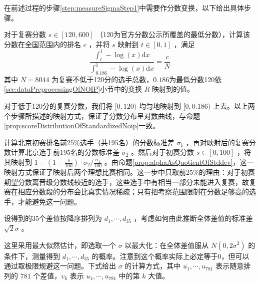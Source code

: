             在前述过程的步骤\ref{step:measureSigmaStep1}中需要作分数变换，以下给出具体步骤。
            \begin{asparaenum}[\bfseries{步骤} 1.]
                \item 对于复赛分数 $s\in [120,600]$ （120为官方分数公示所覆盖的最低分数），计算该分数在全国范围内的排名 $c$ ，并将 $s$ 映射到 $t\in [0,1]$ ，满足 $$\frac{\int_t^1 -\log(x)\mathrm{d}x}{\int_{0.186}^1 -\log(x)\mathrm{d}x}=\frac cN$$ 其中 $N=8044$ 为复赛不低于120分的选手总数，$0.186$为最低分数120依\ref{sec:dataPreprocessingOfNOIP}小节中的变换 $R$ 映射到的值。
                \item 对于低于120分的复赛分数，我们将 $[0,120)$ 均匀地映射到 $[0,0.186)$ 上去。以上两个步骤所描述的映射方式，保证了分数分布呈对数曲线，与命题\ref{prop:scoreDistributionOfStandardizedNoip}一致。
                \item 计算北京初赛排名前25\%选手（共195名）的分数标准差 $\sigma_1$ ，再对映射后的复赛分数计算北京选手前195名的分数标准差 $\sigma_2$ 。然后对于初赛分数 $s\in [0,100]$ ，将其映射到 $1-(1-\frac {s}{100})\cdot\sigma_2/\frac{\sigma_1}{100}$ 。由命题\ref{prop:alphaAsQuotientOfStddev}，这一映射方式保证了映射后两个理想比赛相同。这一步中只取前25\%的理由：对于初赛期望分数离晋级分数线较近的选手，这些选手中有相当一部分未能进入复赛，故复赛在相应分数段的分布会比真实情况稀疏；只有把考察范围限制在分数足够高的选手，才能避免这一问题。
            \end{asparaenum}

            \vspace{1.5ex}

            设得到的35个差值按降序排列为 $d_1,\cdots,d_{35}$ ，考虑如何由此推断全体差值的标准差 $\sqrt{2}\sigma$ 。
            
            这里采用最大似然估计，即选取一个 $\sigma$ 以最大化：在全体差值服从 $N(0,2\sigma^2)$ 的条件下，测量得到 $d_1,\cdots,d_{35}$ 的概率。注意到这个概率实际上必定等于0，但可以通过取极限规避这一问题。下式给出 $\sigma$ 的计算方式，其中 $u_{1},\cdots,u_{781}$ 表示随意排列的 $781$ 个差值，$v_{k}$ 表示 $u_{1},\cdots,u_{781}$ 中的第 $k$ 大值。

